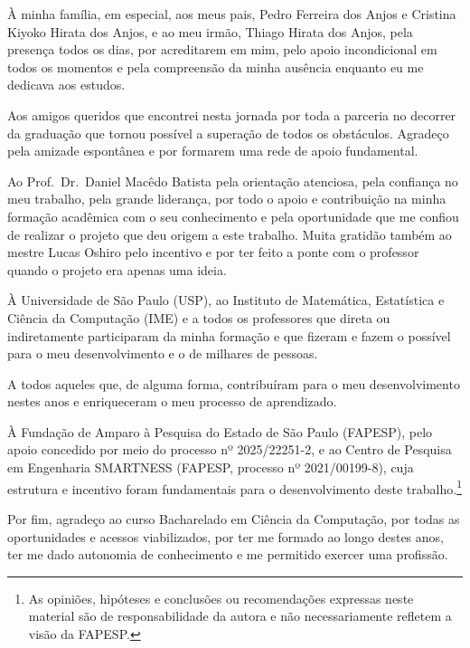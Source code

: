 \documentclass[a4paper,12pt,twoside,english,brazilian]{book}
\begin{document}
À minha família, em especial, aos meus pais, Pedro Ferreira dos Anjos e Cristina Kiyoko Hirata dos Anjos, e ao meu irmão, Thiago Hirata dos Anjos, pela presença todos os dias, por acreditarem em mim, pelo apoio incondicional em todos os momentos e pela compreensão da minha ausência enquanto eu me dedicava aos estudos.


Aos amigos queridos que encontrei nesta jornada por toda a parceria no decorrer da graduação que tornou possível a superação de todos os obstáculos. Agradeço pela amizade espontânea e por formarem uma rede de apoio fundamental.

Ao Prof.\ Dr.\ Daniel Macêdo Batista pela orientação atenciosa, pela confiança no meu trabalho, pela grande liderança, por todo o apoio e contribuição na minha formação acadêmica com o seu conhecimento e pela oportunidade que me confiou de realizar o projeto que deu origem a este trabalho. Muita gratidão também ao mestre Lucas Oshiro pelo incentivo e por ter feito a ponte com o professor quando o projeto era apenas uma ideia.

À Universidade de São Paulo (USP), ao Instituto de Matemática, Estatística e Ciência da Computação (IME) e a todos os professores que direta ou indiretamente participaram da minha formação e que fizeram e fazem o possível para o meu desenvolvimento e o de milhares de pessoas.

A todos aqueles que, de alguma forma, contribuíram para o meu desenvolvimento nestes anos e enriqueceram o meu processo de aprendizado.

À Fundação de Amparo à Pesquisa do Estado de São Paulo (FAPESP), pelo apoio concedido por meio do processo nº 2025/22251-2, e ao Centro de Pesquisa em Engenharia SMARTNESS (FAPESP, processo nº 2021/00199-8), cuja estrutura e incentivo foram fundamentais para o desenvolvimento deste trabalho.\footnote{As opiniões, hipóteses e conclusões ou recomendações expressas neste material são de responsabilidade da autora e não necessariamente refletem a visão da FAPESP.}

Por fim, agradeço ao curso Bacharelado em Ciência da Computação, por todas as oportunidades e acessos viabilizados, por ter me formado ao longo destes anos, ter me dado autonomia de conhecimento e me permitido exercer uma profissão.
\end{document}
